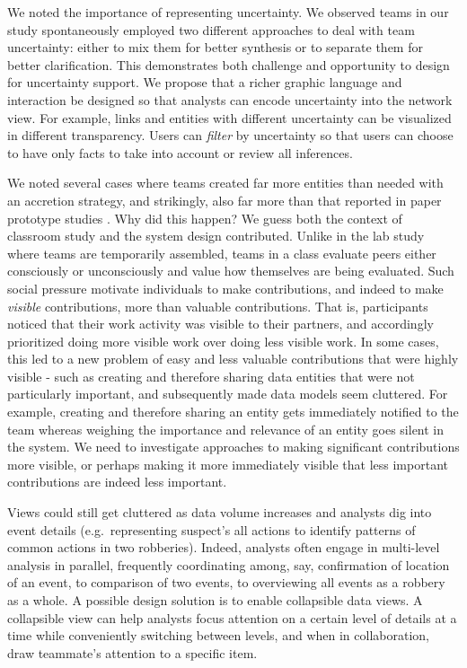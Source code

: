 We noted the importance of representing uncertainty. We observed teams
in our study spontaneously employed two different approaches to deal
with team uncertainty: either to mix them for better synthesis or to
separate them for better clarification. This demonstrates both challenge
and opportunity to design for uncertainty support. We propose that a
richer graphic language and interaction be designed so that analysts can
encode uncertainty into the network view. For example, links and
entities with different uncertainty can be visualized in different
transparency. Users can \emph{filter} by uncertainty so that users can
choose to have only facts to take into account or review all inferences.

We noted several cases where teams created far more entities than needed
with an accretion strategy, and strikingly, also far more than that
reported in paper prototype studies \autocite{Carroll2013}. Why did this
happen? We guess both the context of classroom study and the system
design contributed. Unlike in the lab study where teams are temporarily
assembled, teams in a class evaluate peers either consciously or
unconsciously and value how themselves are being evaluated. Such social
pressure motivate individuals to make contributions, and indeed to make
\emph{visible} contributions, more than valuable contributions. That is,
participants noticed that their work activity was visible to their
partners, and accordingly prioritized doing more visible work over doing
less visible work. In some cases, this led to a new problem of easy and
less valuable contributions that were highly visible - such as creating
and therefore sharing data entities that were not particularly
important, and subsequently made data models seem cluttered. For
example, creating and therefore sharing an entity gets immediately
notified to the team whereas weighing the importance and relevance of an
entity goes silent in the system. We need to investigate approaches to
making significant contributions more visible, or perhaps making it more
immediately visible that less important contributions are indeed less
important.

Views could still get cluttered as data volume increases and analysts
dig into event details (e.g.~representing suspect's all actions to
identify patterns of common actions in two robberies). Indeed, analysts
often engage in multi-level analysis in parallel, frequently
coordinating among, say, confirmation of location of an event, to
comparison of two events, to overviewing all events as a robbery as a
whole. A possible design solution is to enable collapsible data views. A
collapsible view can help analysts focus attention on a certain level of
details at a time while conveniently switching between levels, and when
in collaboration, draw teammate's attention to a specific item.

